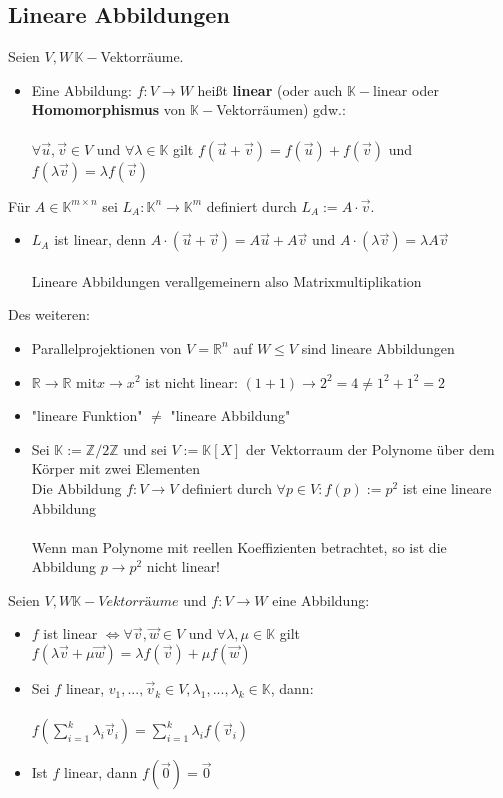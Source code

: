 \documentclass[titlepage]{article}
\newcommand{\K}{\mathbb{K}}
\newcommand{\R}{\mathbb{R}}
\newcommand{\1}{\mathbb{1}}
\newcommand{\0}{\mathbb{0}}
\newcommand{\Z}{\mathbb{Z}}
\begin{document}
			\subsection{Lineare Abbildungen}
				Seien $V,W\,\K-$Vektorräume.
				\begin{itemize}
					\item Eine Abbildung: $f:V\rightarrow W$ heißt \textbf{linear} (oder auch $\K-$linear oder \textbf{Homomorphismus} von $\K-$Vektorräumen) gdw.:\\\\
					$\forall\vec{u},\vec{v}\in V$ und $\forall\lambda\in\K$ gilt $f(\vec{u}+\vec{v})=f(\vec{u})+f(\vec{v})$ und $f(\lambda\vec{v})=\lambda f(\vec{v})$
				\end{itemize}
				Für $A\in\K^{m\times n}$ sei $L_A:\K^n\rightarrow\K^m$ definiert durch $L_A:=A\cdot\vec{v}$.
				\begin{itemize}
					\item $L_A$ ist linear, denn $A\cdot(\vec{u}+\vec{v})=A\vec{u}+A\vec{v}$ und $A\cdot(\lambda\vec{v})=\lambda A\vec{v}$\\\\
					Lineare Abbildungen verallgemeinern also Matrixmultiplikation
				\end{itemize}
				Des weiteren:
				\begin{itemize}
					\item Parallelprojektionen von $V=\R^n$ auf $W\le V$ sind lineare Abbildungen
					\item $\R\rightarrow\R$ mit$x\rightarrow x^2$ ist nicht linear: $(1+1)\rightarrow2^2=4\neq1^2+1^2=2$
					\item "lineare Funktion" $\neq$ "lineare Abbildung"
					\item Sei $\K:=\Z/2\Z$ und sei $V:=\K[X]$ der Vektorraum der Polynome über dem Körper mit zwei Elementen\\
					Die Abbildung $f:V\rightarrow V$ definiert durch $\forall p\in V:f(p):=p^2$ ist eine lineare Abbildung\\\\
					Wenn man Polynome mit reellen Koeffizienten betrachtet, so ist die Abbildung $p\rightarrow p^2$ nicht linear!
				\end{itemize}
				Seien $V,W \K-Vektorräume$ und $f:V\rightarrow W$ eine Abbildung:
				\begin{itemize}
					\item $f$ ist linear $\Longleftrightarrow\forall\vec{v},\vec{w}\in V$ und $\forall\lambda,\mu\in\K$ gilt $f(\lambda\vec{v}+\mu\vec{w})=\lambda f(\vec{v})+\mu f(\vec{w})$
					\item Sei $f$ linear, $v_1,...,\vec{v}_k\in V,\lambda_1,...,\lambda_k\in\K$, dann:\\\\
					$f(\sum\limits^k_{i=1}\lambda_i\vec{v}_i)=\sum\limits^k_{i=1}\lambda_if(\vec{v}_i)$
					\item Ist $f$ linear, dann $f(\vec{0})=\vec{0}$
				\end{itemize}
\end{document}

